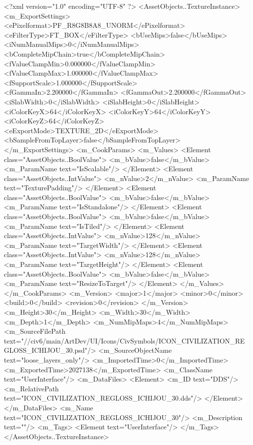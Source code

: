 <?xml version="1.0" encoding="UTF-8" ?>
<AssetObjects..TextureInstance>
	<m_ExportSettings>
		<ePixelformat>PF_R8G8B8A8_UNORM</ePixelformat>
		<eFilterType>FT_BOX</eFilterType>
		<bUseMips>false</bUseMips>
		<iNumManualMips>0</iNumManualMips>
		<bCompleteMipChain>true</bCompleteMipChain>
		<fValueClampMin>0.000000</fValueClampMin>
		<fValueClampMax>1.000000</fValueClampMax>
		<fSupportScale>1.000000</fSupportScale>
		<fGammaIn>2.200000</fGammaIn>
		<fGammaOut>2.200000</fGammaOut>
		<iSlabWidth>0</iSlabWidth>
		<iSlabHeight>0</iSlabHeight>
		<iColorKeyX>64</iColorKeyX>
		<iColorKeyY>64</iColorKeyY>
		<iColorKeyZ>64</iColorKeyZ>
		<eExportMode>TEXTURE_2D</eExportMode>
		<bSampleFromTopLayer>false</bSampleFromTopLayer>
	</m_ExportSettings>
	<m_CookParams>
		<m_Values>
			<Element class="AssetObjects..BoolValue">
				<m_bValue>false</m_bValue>
				<m_ParamName text="IsScalable"/>
			</Element>
			<Element class="AssetObjects..IntValue">
				<m_nValue>2</m_nValue>
				<m_ParamName text="TexturePadding"/>
			</Element>
			<Element class="AssetObjects..BoolValue">
				<m_bValue>false</m_bValue>
				<m_ParamName text="IsStandalone"/>
			</Element>
			<Element class="AssetObjects..BoolValue">
				<m_bValue>false</m_bValue>
				<m_ParamName text="IsTiled"/>
			</Element>
			<Element class="AssetObjects..IntValue">
				<m_nValue>128</m_nValue>
				<m_ParamName text="TargetWidth"/>
			</Element>
			<Element class="AssetObjects..IntValue">
				<m_nValue>128</m_nValue>
				<m_ParamName text="TargetHeight"/>
			</Element>
			<Element class="AssetObjects..BoolValue">
				<m_bValue>false</m_bValue>
				<m_ParamName text="ResizeToTarget"/>
			</Element>
		</m_Values>
	</m_CookParams>
	<m_Version>
		<major>1</major>
		<minor>0</minor>
		<build>0</build>
		<revision>0</revision>
	</m_Version>
	<m_Height>30</m_Height>
	<m_Width>30</m_Width>
	<m_Depth>1</m_Depth>
	<m_NumMipMaps>4</m_NumMipMaps>
	<m_SourceFilePath text="//civ6/main/ArtDev/UI/Icons/CivSymbols/ICON_CIVILIZATION_REGLOSS_ICHIJOU_30.psd"/>
	<m_SourceObjectName text="loose_layers_only"/>
	<m_ImportedTime>0</m_ImportedTime>
	<m_ExportedTime>2027138</m_ExportedTime>
	<m_ClassName text="UserInterface"/>
	<m_DataFiles>
		<Element>
			<m_ID text="DDS"/>
			<m_RelativePath text="ICON_CIVILIZATION_REGLOSS_ICHIJOU_30.dds"/>
		</Element>
	</m_DataFiles>
	<m_Name text="ICON_CIVILIZATION_REGLOSS_ICHIJOU_30"/>
	<m_Description text=""/>
	<m_Tags>
		<Element text="UserInterface"/>
	</m_Tags>
</AssetObjects..TextureInstance>

